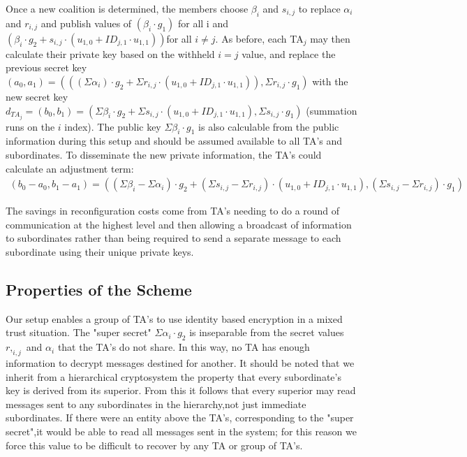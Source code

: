 \documentclass[10pt]{llncs}
\begin{document}
Once a new coalition is determined, the members choose $\beta_i$ and $s_{i,j}$ to replace $\alpha_i$ and $r_{i,j}$ and publish values of $(\beta_i \cdot g_1)$ for all i and $(\beta_i \cdot g_2 + s_{i,j} \cdot (u_{1,0} + ID_{j,1}\cdot u_{1,1}))$for all $i \neq j$.  As before, each TA$_j$ may then calculate their private key based on the withheld $i = j$ value, and replace the previous secret key $(a_0, a_1) = (((\Sigma \alpha_i)\cdot g_2 + \Sigma r_{i,j} \cdot (u_{1,0} + ID_{j,1}\cdot u_{1,1})), \Sigma r_{i,j} \cdot g_1)$ with the new secret key $d_{TA_j} = (b_0, b_1) = (\Sigma \beta_i \cdot g_2
 + \Sigma s_{i,j} \cdot (u_{1,0} + ID_{j,1}\cdot u_{1,1}), \Sigma s_{i,j} \cdot g_1)$ (summation runs on the $i$ index). The public key $\Sigma \beta_i \cdot g_1$ is also calculable from the public information during this setup and should be assumed available to all TA's and subordinates.   To disseminate the new private information, the TA's could calculate an adjustment term:
\begin{align*}
(b_0 - a_0, b_1 - a_1) = ((\Sigma \beta_i - \Sigma \alpha_i) \cdot g_2 + (\Sigma s_{i,j} - \Sigma r_{i,j})\cdot (u_{1,0} + ID_{j,1} \cdot u_{1,1}), (\Sigma s_{i,j} - \Sigma r_{i,j})\cdot g_1)
\end{align*}

The savings in reconfiguration costs come from TA’s needing to do a round of communication at the highest level and then allowing a broadcast of information to subordinates rather than being required to send a separate message to each subordinate using their unique private keys.

\subsection{Properties of the Scheme}

Our setup enables a group of TA's to use identity based encryption in a mixed trust situation. The "super secret" $\Sigma \alpha_i \cdot g_2$ is inseparable from the secret values $r,_{i,j}$ and $\alpha_i$ that the TA's do not share. In this way, no TA has enough information to decrypt messages destined for another.  It should be noted that we inherit from a hierarchical cryptosystem the property that every subordinate's key is derived from its superior. From this  it follows that every superior may read messages sent to any subordinates in the hierarchy,not just immediate subordinates.  If there were an entity above the TA's, corresponding to the "super secret",it would be able to read all messages sent in the system; for this reason we force this value to be difficult to recover by any TA or group of TA's.
\end{document}
